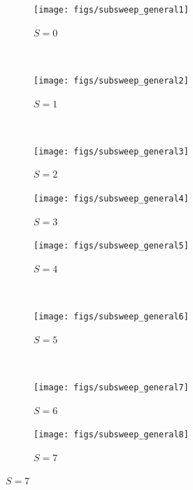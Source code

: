 \begin{figure}
    \centering
    \begin{subfigure}[b]{0.2\textwidth}
        \texttt{[image: figs/subsweep\_general1]}
        \caption{$S=0$}
        \label{fig:subsweep_general1}
    \end{subfigure}
    ~ 
    \begin{subfigure}[b]{0.2\textwidth}
        \texttt{[image: figs/subsweep\_general2]}
        \caption{$S=1$}
        \label{fig:subsweep_general2}
    \end{subfigure}
    ~ 
    \begin{subfigure}[b]{0.2\textwidth}
        \texttt{[image: figs/subsweep\_general3]}
        \caption{$S=2$}
        \label{fig:subsweep_general3}
    \end{subfigure}
    \begin{subfigure}[b]{0.2\textwidth}
        \texttt{[image: figs/subsweep\_general4]}
        \caption{$S=3$}
        \label{fig:subsweep_general4}
    \end{subfigure}
    
    \begin{subfigure}[b]{0.2\textwidth}
        \texttt{[image: figs/subsweep\_general5]}
        \caption{$S=4$}
        \label{fig:subsweep_general5}
    \end{subfigure}
    ~ 
    \begin{subfigure}[b]{0.2\textwidth}
        \texttt{[image: figs/subsweep\_general6]}
        \caption{$S=5$}
        \label{fig:subsweep_general6}
    \end{subfigure}
    ~ 
    \begin{subfigure}[b]{0.2\textwidth}
        \texttt{[image: figs/subsweep\_general7]}
        \caption{$S=6$}
        \label{fig:subsweep_general7}
    \end{subfigure}
    \begin{subfigure}[b]{0.2\textwidth}
        \texttt{[image: figs/subsweep\_general8]}
        \caption{$S=7$}
        \label{fig:subsweep_general8}
    \end{subfigure}
    

\end{figure}

